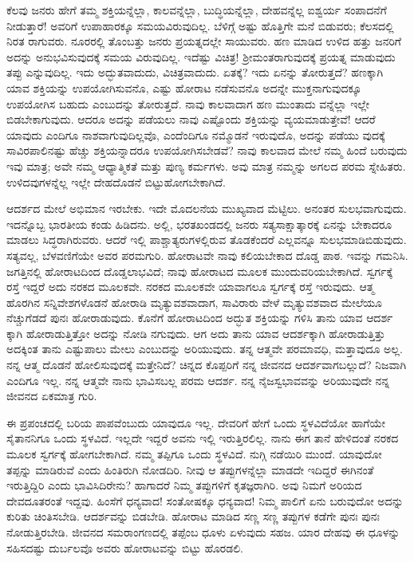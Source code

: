 ಕೆಲವು ಜನರು ಹೇಗೆ ತಮ್ಮ ಶಕ್ತಿಯನ್ನೆಲ್ಲಾ, ಕಾಲವನ್ನೆಲ್ಲಾ, ಬುದ್ಧಿಯನ್ನೆಲ್ಲಾ, ದೇಹವನ್ನೆಲ್ಲ ಐಶ್ವರ್ಯ ಸಂಪಾದನೆಗೆ ನೀಡುತ್ತಾರೆ! ಅವರಿಗೆ ಉಪಾಹಾರಕ್ಕೂ ಸಮಯವಿರುವುದಿಲ್ಲ. ಬೆಳಿಗ್ಗೆ ಅಷ್ಟು ಹೊತ್ತಿಗೇ ಮನೆ ಬಿಡುವರು; ಕೆಲಸದಲ್ಲಿ ನಿರತ ರಾಗುವರು. ನೂರರಲ್ಲಿ ತೊಂಬತ್ತು ಜನರು ಪ್ರಯತ್ನದಲ್ಲೇ ಸಾಯುವರು. ಹಣ ಮಾಡಿದ ಉಳಿದ ಹತ್ತು ಜನರಿಗೆ ಅದನ್ನು ಅನುಭವಿಸುವುದಕ್ಕೆ ಸಮಯ ವಿರುವುದಿಲ್ಲ. ಇದೆಷ್ಟು ವಿಚಿತ್ರ! ಶ‍್ರೀಮಂತರಾಗುವುದಕ್ಕೆ ಪ್ರಯತ್ನ ಮಾಡುವುದು ತಪ್ಪು ಎನ್ನುವುದಿಲ್ಲ. ಇದು ಅದ್ಭುತವಾದುದು, ವಿಚಿತ್ರವಾದುದು. ಏತಕ್ಕೆ? ಇದು ಏನನ್ನು ತೋರುತ್ತದೆ? ಹಣಕ್ಕಾಗಿ ಯಾವ ಶಕ್ತಿಯನ್ನು ಉಪಯೋಗಿಸುವನೊ, ಎಷ್ಟು ಹೋರಾಟ ನಡೆಸುವನೊ ಅದನ್ನೇ ಮುಕ್ತನಾಗುವುದಕ್ಕೂ ಉಪಯೋಗಿಸ ಬಹುದು ಎಂಬುದನ್ನು ತೋರುತ್ತದೆ. ನಾವು ಕಾಲವಾದಾಗ ಹಣ ಮುಂತಾದು ವನ್ನೆಲ್ಲಾ ಇಲ್ಲೇ ಬಿಡಬೇಕಾಗುವುದು. ಆದರೂ ಅದನ್ನು ಪಡೆಯಲು ನಾವು ಎಷ್ಟೊಂದು ಶಕ್ತಿಯನ್ನು ವ್ಯಯಮಾಡುತ್ತೇವೆ! ಆದರೆ ಯಾವುದು ಎಂದಿಗೂ ನಾಶವಾಗುವುದಿಲ್ಲವೊ, ಎಂದೆಂದಿಗೂ ನಮ್ಮೊಡನೆ ಇರುವುದೊ, ಅದನ್ನು ಪಡೆಯು ವುದಕ್ಕೆ ಸಾವಿರಪಾಲಿನಷ್ಟು ಹೆಚ್ಚು ಶಕ್ತಿಯನ್ನಾದರೂ ಉಪಯೋಗಿಸಬೇಡವೆ? ನಾವು ಕಾಲವಾದ ಮೇಲೆ ನಮ್ಮ ಹಿಂದೆ ಬರುವುದು ಇವು ಮಾತ್ರ; ಅವೇ ನಮ್ಮ ಆಧ್ಯಾತ್ಮಿಕತೆ ಮತ್ತು ಪುಣ್ಯ ಕರ್ಮಗಳು. ಅವು ಮಾತ್ರ ನಮ್ಮನ್ನು ಅಗಲದ ಪರಮ ಸ್ನೇಹಿತರು. ಉಳಿದವುಗಳನ್ನೆಲ್ಲ ಇಲ್ಲೇ ದೇಹದೊಡನೆ ಬಿಟ್ಟುಹೋಗಬೇಕಾಗಿದೆ.

ಆದರ್ಶದ ಮೇಲೆ ಅಭಿಮಾನ ಇರಬೇಕು. ಇದೇ ಮೊದಲನೆಯ ಮುಖ್ಯವಾದ ಮೆಟ್ಟಿಲು. ಅನಂತರ ಸುಲಭವಾಗುವುದು. ಇದನ್ನೊಬ್ಬ ಭಾರತೀಯ ಕಂಡು ಹಿಡಿದನು. ಅಲ್ಲಿ, ಭರತಖಂಡದಲ್ಲಿ ಜನರು ಸತ್ಯಸಾಕ್ಷಾತ್ಕಾರಕ್ಕೆ ಏನನ್ನು ಬೇಕಾದರೂ ಮಾಡಲು ಸಿದ್ಧರಾಗಿರುವರು. ಆದರೆ ಇಲ್ಲಿ ಪಾಶ್ಚಾತ್ಯರುಗಳಲ್ಲಿರುವ ತೊಡಕೆಂದರೆ ಎಲ್ಲವನ್ನೂ ಸುಲಭಮಾಡಿಬಿಡುವುದು. ಸತ್ಯವಲ್ಲ, ಬೆಳವಣಿಗೆಯೇ ಅವರ ಪರಮಗುರಿ. ಹೋರಾಟವೇ ನಾವು ಕಲಿಯಬೇಕಾದ ದೊಡ್ಡ ಪಾಠ. ಇವನ್ನು ಗಮನಿಸಿ. ಜಗತ್ತಿನಲ್ಲಿ ಹೋರಾಟದಿಂದ ದೊಡ್ಡಲಾಭವಿದೆ; ನಾವು ಹೋರಾಟದ ಮೂಲಕ ಮುಂದುವರಿಯಬೇಕಾಗಿದೆ. ಸ್ವರ್ಗಕ್ಕೆ ರಸ್ತೆ ಇದ್ದರೆ ಅದು ನರಕದ ಮೂಲಕವೇ. ನರಕದ ಮೂಲಕವೇ ಯಾವಾಗಲೂ ಸ್ವರ್ಗಕ್ಕೆ ರಸ್ತೆ ಇರುವುದು. ಆತ್ಮ ಹೊರಗಿನ ಸನ್ನಿವೇಶಗಳೊಡನೆ ಹೋರಾಡಿ ಮೃತ್ಯುವಶವಾದಾಗ, ಸಾವಿರಾರು ವೇಳೆ ಮೃತ್ಯುವಶವಾದ ಮೇಲೆಯೂ ನೆಚ್ಚುಗೆಡದೆ ಪುನಃ ಹೋರಾಡುವುದು. ಕೊನೆಗೆ ಹೋರಾಟದಿಂದ ಅದ್ಭುತ ಶಕ್ತಿಯನ್ನು ಗಳಿಸಿ ತಾನು ಯಾವ ಆದರ್ಶ ಕ್ಕಾಗಿ ಹೋರಾಡುತ್ತಿತ್ತೋ ಅದನ್ನು ನೋಡಿ ನಗುವುದು. ಆಗ ಅದು ತಾನು ಯಾವ ಆದರ್ಶಕ್ಕಾಗಿ ಹೋರಾಡುತ್ತಿತ್ತು ಅದಕ್ಕಿಂತ ತಾನು ಎಷ್ಟುಪಾಲು ಮೇಲು ಎಂಬುದನ್ನು ಅರಿಯುವುದು. ತನ್ನ ಆತ್ಮವೇ ಪರಮಾವಧಿ, ಮತ್ತಾವುದೂ ಅಲ್ಲ. ನನ್ನ ಆತ್ಮ ದೊಡನೆ ಹೋಲಿಸುವುದಕ್ಕೆ ಮತ್ತೇನಿದೆ? ಚಿನ್ನದ ಕೊಪ್ಪರಿಗೆ ನನ್ನ ಜೀವನದ ಆದರ್ಶವಾಗಬಲ್ಲುದೆ? ನಿಜವಾಗಿ ಎಂದಿಗೂ ಇಲ್ಲ. ನನ್ನ ಆತ್ಮವೇ ನಾನು ಭಾವಿಸಬಲ್ಲ ಪರಮ ಆದರ್ಶ. ನನ್ನ ನೈಜಸ್ವಭಾವವನ್ನು ಅರಿಯುವುದೇ ನನ್ನ ಜೀವನದ ಏಕಮಾತ್ರ ಗುರಿ.

ಈ ಪ್ರಪಂಚದಲ್ಲಿ ಬರಿಯ ಪಾಪವೆಂಬುದು ಯಾವುದೂ ಇಲ್ಲ. ದೇವರಿಗೆ ಹೇಗೆ ಒಂದು ಸ್ಥಳವಿದೆಯೋ ಹಾಗೆಯೇ ಸೈತಾನನಿಗೂ ಒಂದು ಸ್ಥಳವಿದೆ. ಇಲ್ಲದೇ ಇದ್ದರೆ ಅವನು ಇಲ್ಲಿ ಇರುತ್ತಿರಲಿಲ್ಲ. ನಾನು ಈಗ ತಾನೆ ಹೇಳಿದಂತೆ ನರಕದ ಮೂಲಕ ಸ್ವರ್ಗಕ್ಕೆ ಹೋಗಬೇಕಾಗಿದೆ. ನಮ್ಮ ತಪ್ಪಿಗೂ ಒಂದು ಸ್ಥಳವಿದೆ. ನುಗ್ಗಿ ನಡೆಯಿರಿ ಮುಂದೆ. ಯಾವುದೋ ತಪ್ಪನ್ನು ಮಾಡಿರುವೆ ಎಂದು ಹಿಂತಿರುಗಿ ನೋಡದಿರಿ. ನೀವು ಆ ತಪ್ಪುಗಳನ್ನೆಲ್ಲಾ ಮಾಡದೇ ಇದಿದ್ದರೆ ಈಗಿನಂತೆ ಇರುತ್ತಿದ್ದಿರಿ ಎಂದು ಭಾವಿಸಿದಿರೇನು? ಹಾಗಾದರೆ ನಿಮ್ಮ ತಪ್ಪುಗಳಿಗೆ ಕೃತಜ್ಞರಾಗಿರಿ. ಅವು ನಿಮಗೆ ಅರಿಯದ ದೇವದೂತರಂತೆ ಇದ್ದವು. ಹಿಂಸೆಗೆ ಧನ್ಯವಾದ! ಸಂತೋಷಕ್ಕೂ ಧನ್ಯವಾದ! ನಿಮ್ಮ ಪಾಲಿಗೆ ಏನು ಬರುವುದೋ ಅದನ್ನು ಕುರಿತು ಚಿಂತಿಸಬೇಡಿ. ಆದರ್ಶವನ್ನು ಬಿಡಬೇಡಿ. ಹೋರಾಟ ಮಾಡಿದ ಸಣ್ಣ ಸಣ್ಣ ತಪ್ಪುಗಳ ಕಡೆಗೇ ಪುನಃ ಪುನಃ ನೋಡುತ್ತಿರಬೇಡಿ. ಜೀವನದ ಸಮರಾಂಗಣದಲ್ಲಿ ತಪ್ಪೆಂಬ ಧೂಳು ಏಳುವುದು ಸಹಜ. ಯಾರ ದೇಹವು ಈ ಧೂಳನ್ನು ಸಹಿಸದಷ್ಟು ದುರ್ಬಲವೊ ಅವರು ಹೋರಾಟವನ್ನು ಬಿಟ್ಟು ಹೊರಡಲಿ.

